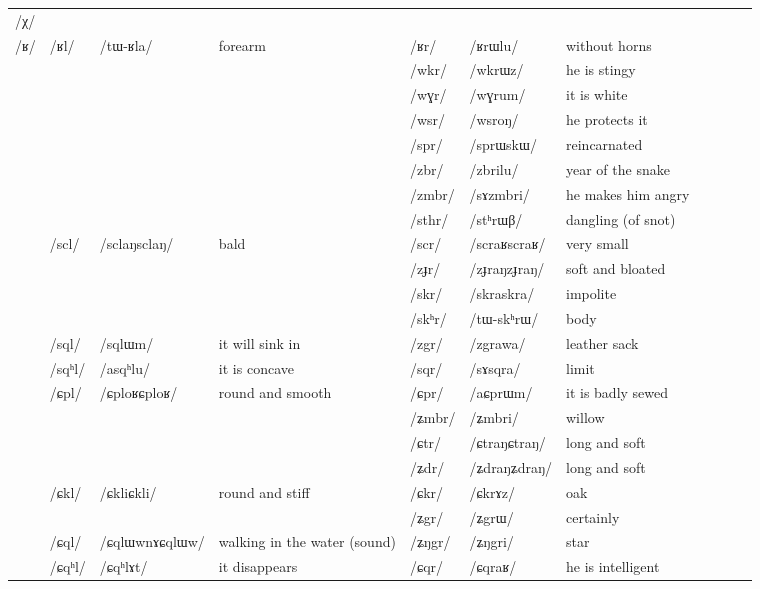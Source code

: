 \documentclass[oldfontcommands,oneside,a4paper,11pt]{article}
\newcommand{\ipa}[1]{{\phon/#1/}} %
\newcommand{\deux}[1]{/#1/}
\newcommand{\trois}[1]{/#1/}
\newcommand{\tib}[1]{\cellcolor{lightgray}\textbf{#1}}
\newcommand{\idph}[1]{\cellcolor{gray}\textbf{#1}}
\begin{document}
\begin{table}
{\begin{tabular}{l|lll|lll|lll|l}
\ipa{χ} 	&  	&  	&  	&  	&  	& \\	
\ipa{ʁ} 	& \deux{ʁl} 	& \ipa{tɯ-ʁla} 	& forearm 	& \deux{ʁr} 	& \ipa{ʁrɯlu} 	& without horns\\	
\midrule							
	&	&	&	&\trois{wkr}  	& \ipa{wkrɯz}  	&he is stingy \\	
	&	&	&	&\trois{wɣr}  	&\ipa{wɣrum}  	&it is white\\	
	&	&	&  	&\trois{wsr}  	&\ipa{wsroŋ}  	&he protects it\\	
\midrule							
	&	&	&	&\trois{spr}  	& \ipa{sprɯskɯ}  	&  reincarnated\\	
	&	&	&	&\trois{zbr}  \tib{} 	& \ipa{zbrilu}  	& year of the snake \\	
	&	&	&	&\trois{zmbr}  	& \ipa{sɤzmbri}  	& he makes him angry\\	
	&	&	&	&\trois{sthr}  \idph{} 	& \ipa{stʰrɯβ}  	& dangling (of snot) \\	
	&\trois{scl}  \idph{}	& \ipa{sclaŋsclaŋ}  	& bald	&\trois{scr}  \idph{}	& \ipa{scraʁscraʁ}  	& very small	&\\
	&	&	&	&\trois{zɟr} \idph{} 	& \ipa{zɟraŋzɟraŋ}  	& soft and bloated\\	
	&	&	&	&\trois{skr}  	& \ipa{skraskra}  	& impolite \\	
	&	&	&	&\trois{skʰr}  	& \ipa{tɯ-skʰrɯ}  	& body \\	
	&\trois{sql}  	& \ipa{sqlɯm}  	&it will sink in 	&\trois{zgr} \tib{} 	& \ipa{zgrawa}    	&leather sack\\	
	&\trois{sqʰl}  	& \ipa{asqʰlu}  	&it is concave 	&\trois{sqr}  	& \ipa{sɤsqra}   	&limit\\	
\midrule							
	&\trois{ɕpl}	&\ipa{ɕploʁɕploʁ}	&round and smooth	&\trois{ɕpr}  	& \ipa{aɕprɯm}  	& it is badly sewed\\	
	&	&	&	&\trois{ʑmbr}  	& \ipa{ʑmbri}  	& willow\\	
	&	&	&	&\trois{ɕtr}  \idph{}	& \ipa{ɕtraŋɕtraŋ}  	& long and soft\\	
	&	&	&	&\trois{ʑdr}  \idph{}	& \ipa{ʑdraŋʑdraŋ}  	&  long and soft\\	
	&\trois{ɕkl}	&\ipa{ɕkliɕkli}	&round and stiff	&\trois{ɕkr}  	& \ipa{ɕkrɤz}  	&oak \\	
	&	&	&	&\trois{ʑgr}  	& \ipa{ʑgrɯ}  	&certainly \\	
	&\trois{ɕql}  \idph{}	& \ipa{ɕqlɯwnɤɕqlɯw}  	&  walking in the water (sound)	&\trois{ʑŋgr}  	& \ipa{ʑŋgri}  	&star \\	
	&\trois{ɕqʰl}  	& \ipa{ɕqʰlɤt}  	&it disappears 	&\trois{ɕqr}  	& \ipa{ɕqraʁ}  	& he is intelligent \\	

\end{tabular}}
\end{table}
\end{document}
